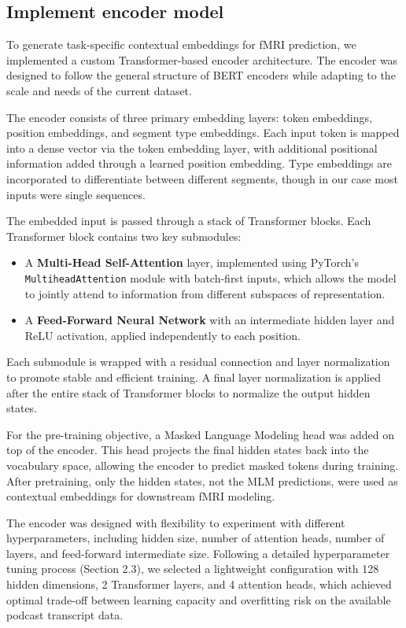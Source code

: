 \documentclass[11pt,letterpaper]{article}
\begin{document}
\vspace{1em} %
\subsection{Implement encoder model}
\vspace{0.5em} %

To generate task-specific contextual embeddings for fMRI prediction, we implemented a custom Transformer-based encoder architecture. The encoder was designed to follow the general structure of BERT encoders while adapting to the scale and needs of the current dataset.

The encoder consists of three primary embedding layers: token embeddings, position embeddings, and segment type embeddings. Each input token is mapped into a dense vector via the token embedding layer, with additional positional information added through a learned position embedding. Type embeddings are incorporated to differentiate between different segments, though in our case most inputs were single sequences.

The embedded input is passed through a stack of Transformer blocks. Each Transformer block contains two key submodules:

\begin{itemize}
    \item A \textbf{Multi-Head Self-Attention} layer, implemented using PyTorch’s \verb|MultiheadAttention| module with batch-first inputs, which allows the model to jointly attend to information from different subspaces of representation.
    \item A \textbf{Feed-Forward Neural Network} with an intermediate hidden layer and ReLU activation, applied independently to each position.
\end{itemize}
Each submodule is wrapped with a residual connection and layer normalization to promote stable and efficient training. A final layer normalization is applied after the entire stack of Transformer blocks to normalize the output hidden states.

For the pre-training objective, a Masked Language Modeling head was added on top of the encoder. This head projects the final hidden states back into the vocabulary space, allowing the encoder to predict masked tokens during training. After pretraining, only the hidden states, not the MLM predictions, were used as contextual embeddings for downstream fMRI modeling.

The encoder was designed with flexibility to experiment with different hyperparameters, including hidden size, number of attention heads, number of layers, and feed-forward intermediate size. Following a detailed hyperparameter tuning process (Section 2.3), we selected a lightweight configuration with 128 hidden dimensions, 2 Transformer layers, and 4 attention heads, which achieved optimal trade-off between learning capacity and overfitting risk on the available podcast transcript data.
\end{document}
